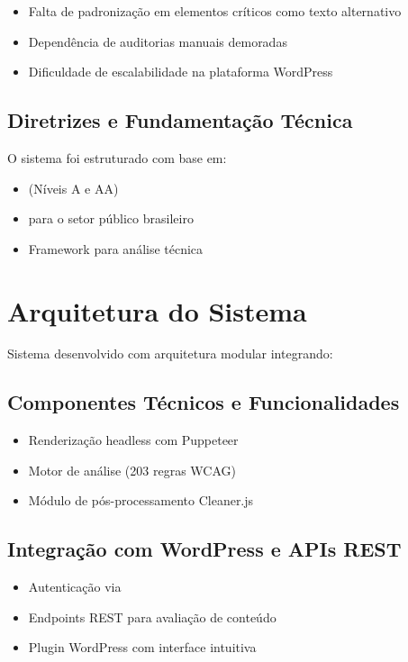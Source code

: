 \documentclass[12pt]{article}
\begin{document}
\begin{itemize}
\item Falta de padronização em elementos críticos como texto alternativo
\item Dependência de auditorias manuais demoradas
\item Dificuldade de escalabilidade na plataforma WordPress
\end{itemize}

\subsection{Diretrizes e Fundamentação Técnica}\label{subsec:diretrizes}
O sistema foi estruturado com base em:

\begin{itemize}
\item\cite{wcag22} (Níveis A e AA)
\item\cite{emag} para o setor público brasileiro
\item Framework\cite{axecore} para análise técnica
\end{itemize}

\section{Arquitetura do Sistema}\label{sec:arquitetura}
Sistema desenvolvido com arquitetura modular integrando:

\subsection{Componentes Técnicos e Funcionalidades}\label{subsec:componentes}
\begin{itemize}
\item Renderização headless com Puppeteer\cite{puppeteer}
\item Motor de análise\cite{axecore} (203 regras WCAG)
\item Módulo de pós-processamento Cleaner.js
\end{itemize}

\subsection{Integração com WordPress e APIs REST}\label{subsec:api}
\begin{itemize}
\item Autenticação via\cite{jwt}
\item Endpoints REST para avaliação de conteúdo
\item Plugin WordPress com interface intuitiva
\end{itemize}

\nocite{*}
\printbibliography[title={Referências}]
\end{document}
